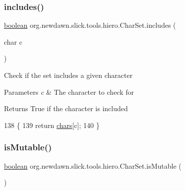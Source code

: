 \subsubsection{\texorpdfstring{includes()}{includes()}}
{\footnotesize\ttfamily \mbox{\hyperlink{classorg_1_1newdawn_1_1slick_1_1tools_1_1hiero_1_1_char_set_a45913b69f90ce574d65a9023e9d1257c}{boolean}} org.\+newdawn.\+slick.\+tools.\+hiero.\+Char\+Set.\+includes (\begin{DoxyParamCaption}\item[{char}]{c }\end{DoxyParamCaption})\hspace{0.3cm}{\ttfamily [inline]}}

Check if the set includes a given character


\begin{DoxyParams}{Parameters}
{\em c} & The character to check for \\
\hline
\end{DoxyParams}
\begin{DoxyReturn}{Returns}
True if the character is included 
\end{DoxyReturn}

\begin{DoxyCode}
138                                     \{
139         \textcolor{keywordflow}{return} \mbox{\hyperlink{classorg_1_1newdawn_1_1slick_1_1tools_1_1hiero_1_1_char_set_abc7c29b42b721d99a1cfc9d2ae97de07}{chars}}[c];
140     \}
\end{DoxyCode}
\mbox{\label{classorg_1_1newdawn_1_1slick_1_1tools_1_1hiero_1_1_char_set_a341bd96ad632d2be1fc2852acafebf95}} 
\subsubsection{\texorpdfstring{is\+Mutable()}{isMutable()}}
{\footnotesize\ttfamily \mbox{\hyperlink{classorg_1_1newdawn_1_1slick_1_1tools_1_1hiero_1_1_char_set_a45913b69f90ce574d65a9023e9d1257c}{boolean}} org.\+newdawn.\+slick.\+tools.\+hiero.\+Char\+Set.\+is\+Mutable (\begin{DoxyParamCaption}{ }\end{DoxyParamCaption})\hspace{0.3cm}{\ttfamily [inline]}}

